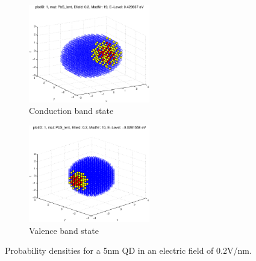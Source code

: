 \begin{figure}
	\centering
	\begin{subfigure}{200px}
		\includegraphics[width=200px]{Fig/Plots/r25v02CB}
		\caption{Conduction band state}
	\end{subfigure}
	\begin{subfigure}{200px}
		\includegraphics[width=200px]{Fig/Plots/r25v02VB}
		\caption{Valence band state}
	\end{subfigure}	
	\caption{Probability densities for a 5nm QD in an electric field of 0.2V/nm.}
	\label{fig:EfieldWaveFn}
\end{figure}
%
